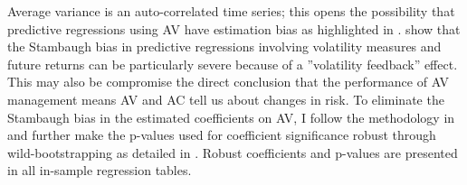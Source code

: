 
Average variance is an auto-correlated time series; this opens the possibility that predictive regressions using AV have estimation bias as highlighted in \citet{stambaugh_predictive_1999}. \citet{campbell_no_1992} show that the Stambaugh bias in predictive regressions involving volatility measures and future returns can be particularly severe because of a ”volatility feedback” effect. This may also be compromise the direct conclusion that the performance of AV management means AV and AC tell us about changes in risk. To eliminate the Stambaugh bias in the estimated coefficients on AV, I follow the methodology in \citet{Amihud2004} and further make the p-values used for coefficient significance robust through wild-bootstrapping as detailed in \citet{mackinnon_bootstrap_2002}. Robust coefficients and p-values are presented in all in-sample regression tables.

